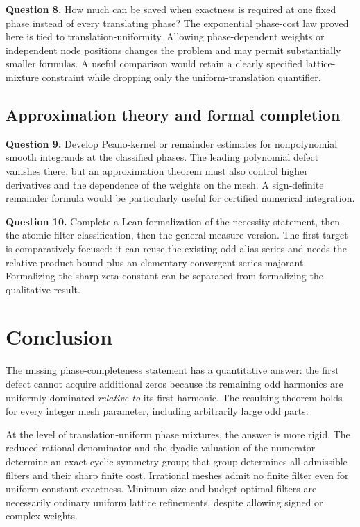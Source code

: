 \documentclass[11pt,a4paper]{article}
\numberwithin{equation}{section}
\theoremstyle{plain}
\theoremstyle{definition}
\theoremstyle{remark}
\begin{document}
\textbf{Question 8.} How much can be saved when exactness is required at
one fixed phase instead of every translating phase? The exponential
phase-cost law proved here is tied to translation-uniformity. Allowing
phase-dependent weights or independent node positions changes the problem
and may permit substantially smaller formulas. A useful comparison would
retain a clearly specified lattice-mixture constraint while dropping only
the uniform-translation quantifier.

\subsection{Approximation theory and formal completion}

\textbf{Question 9.} Develop Peano-kernel or remainder estimates for
nonpolynomial smooth integrands at the classified phases. The leading
polynomial defect vanishes there, but an approximation theorem must also
control higher derivatives and the dependence of the weights on the
mesh. A sign-definite remainder formula would be particularly useful for
certified numerical integration.

\textbf{Question 10.} Complete a Lean formalization of the necessity
statement, then the atomic filter classification, then the general
measure version. The first target is comparatively focused: it can reuse
the existing odd-alias series and needs the relative product bound plus
an elementary convergent-series majorant. Formalizing the sharp zeta
constant can be separated from formalizing the qualitative result.

\section{Conclusion}

The missing phase-completeness statement has a quantitative answer: the
first defect cannot acquire additional zeros because its remaining odd
harmonics are uniformly dominated \emph{relative to} its first harmonic.
The resulting theorem holds for every integer mesh parameter, including
arbitrarily large odd parts.

At the level of translation-uniform phase mixtures, the answer is more
rigid. The reduced rational denominator and the dyadic valuation of the
numerator determine an exact cyclic symmetry group; that group determines
all admissible filters and their sharp finite cost. Irrational meshes
admit no finite filter even for uniform constant exactness. Minimum-size
and budget-optimal filters are necessarily ordinary uniform lattice
refinements, despite allowing signed or complex weights.
\end{document}
